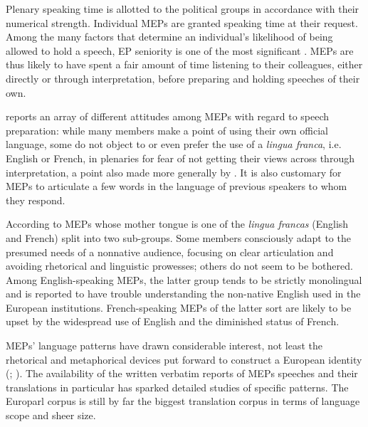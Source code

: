 \documentclass[output=paper]{langscibook}
\begin{document}
Plenary speaking time is allotted to the political groups in accordance with their numerical strength. Individual MEPs are granted speaking time at their request. Among the many factors that determine an individual’s likelihood of being allowed to hold a speech, EP seniority is one of the most significant \citep{SlapinProksch2010}. MEPs are thus likely to have spent a fair amount of time listening to their colleagues, either directly or through interpretation, before preparing and holding speeches of their own. 

\citet{Wright2007} reports an array of different attitudes among MEPs with regard to speech preparation: while many members make a point of using their own official language, some do not object to or even prefer the use of a \textit{lingua franca}, i.e. English or French, in plenaries for fear of not getting their views across through interpretation, a point also made more generally by \citet{KurzBasel2009}. It is also customary for MEPs to articulate a few words in the language of previous speakers to whom they respond. 

According to \citet{Wright2007} MEPs whose mother tongue is one of the \textit{lingua francas} (English and French) split into two sub-groups. Some members consciously adapt to the presumed needs of a nonnative audience, focusing on clear articulation and avoiding rhetorical and linguistic prowesses; others do not seem to be bothered. Among English-speaking MEPs, the latter group tends to be strictly monolingual and is reported to have trouble understanding the non-na\-tive English used in the European institutions. French-speaking MEPs of the latter sort are likely to be upset by the widespread use of English and the diminished status of French. 

MEPs’ language patterns have drawn considerable interest, not least the rhetorical and metaphorical devices put forward to construct a European identity (\citealt{DeAngelis2011}; \citealt{Flottum2013}). The availability of the written verbatim reports of MEPs speeches and their translations in particular has sparked detailed studies of specific patterns. The Europarl corpus is still by far the biggest translation corpus in terms of language scope and sheer size.
\end{document}
